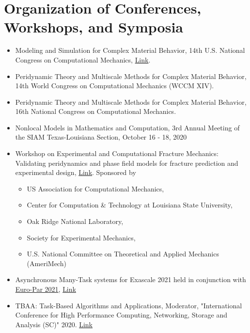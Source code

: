 \documentclass[11pt,a4paper,sans]{moderncv}
\begin{document}
\section{Organization of Conferences, Workshops, and Symposia}
\begin{itemize}[leftmargin=4cm]
\item Modeling and Simulation for Complex Material Behavior, 14th U.S. National Congress on Computational Mechanics, \href{http://14.usnccm.org/MS402}{Link}.
\item Peridynamic Theory and Multiscale Methods for Complex Material Behavior, 14th World Congress on Computational Mechanics (WCCM XIV).
\item Peridynamic Theory and Multiscale Methods for Complex Material Behavior, 16th National Congress on Computational Mechanics. 
\item Nonlocal Models in Mathematics and Computation, 3rd Annual Meeting of the SIAM Texas-Louisiana Section, October 16 - 18, 2020 
\end{itemize}
\begin{itemize}[leftmargin=4cm]
\item Workshop on Experimental and Computational Fracture Mechanics:  Validating peridynamics and phase field models for fracture
prediction and experimental design, \href{http://wfm2020.usacm.org/}{Link}. Sponsored by
\begin{itemize}
\item US Association for Computational Mechanics,
\item Center for Computation \& Technology at Louisiana State University, 
\item Oak Ridge National Laboratory,
\item Society for Experimental Mechanics,
\item U.S. National Committee on Theoretical and Applied Mechanics (AmeriMech)
\end{itemize}
\item Asynchronous Many-Task systems for Exascale 2021 held in conjunction with \href{https://2021.euro-par.org/}{Euro-Par 2021}, \href{https://amte2021.stellar-group.org}{Link}
\end{itemize}

\begin{itemize}[leftmargin=4cm]
\item TBAA: Task-Based Algorithms and Applications, Moderator, "International Conference for High Performance Computing, Networking, Storage and Analysis (SC)" 2020. \href{https://stellar-group.org/research/tbaa2020-scpanel/}{Link}
\end{itemize}
\end{document}
